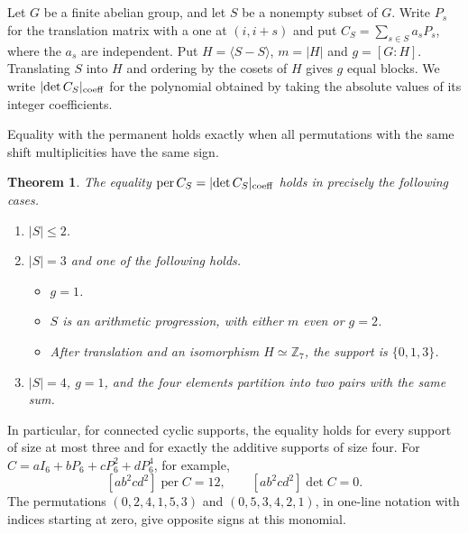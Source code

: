 \documentclass[11pt,reqno]{amsart}
\newtheorem{theorem}{Theorem}[section]
\theoremstyle{remark}
\numberwithin{equation}{section}
\newcommand{\per}{\operatorname{per}}
\begin{document}
\subsection{}

Let \(G\) be a finite abelian group, and let \(S\) be a nonempty
subset of \(G\). Write \(P_s\) for the translation matrix with a
one at \((i,i+s)\) and put \(C_S=\sum_{s\in S}a_sP_s\), where the
\(a_s\) are independent. Put \(H=\langle S-S\rangle\), \(m=|H|\)
and \(g=[G:H]\). Translating \(S\) into \(H\) and ordering by the
cosets of \(H\) gives \(g\) equal blocks. We write
\(\lvert\det C_S\rvert_{\rm coeff}\) for the polynomial obtained by
taking the absolute values of its integer coefficients.

Equality with the permanent holds exactly when all permutations
with the same shift multiplicities have the same sign.

\begin{theorem}\label{thm:sign-classification}
The equality \(\per C_S=\lvert\det C_S\rvert_{\rm coeff}\)
holds in precisely the following cases.
\begin{enumerate}
\item \(|S|\leq2\).
\item \(|S|=3\) and one of the following holds.
\begin{itemize}
\item \(g=1\).
\item \(S\) is an arithmetic progression, with either \(m\) even or \(g=2\).
\item After translation and an isomorphism \(H\simeq\mathbb Z_7\),
      the support is \(\{0,1,3\}\).
\end{itemize}
\item \(|S|=4\), \(g=1\), and the four elements partition into
      two pairs with the same sum.
\end{enumerate}
\end{theorem}

In particular, for connected cyclic supports, the equality holds
for every support of size at most three and for exactly the additive
supports of size four. For \(C=aI_6+bP_6+cP_6^2+dP_6^4\), for
example,
\[
 [ab^2cd^2]\per C=12,\qquad [ab^2cd^2]\det C=0.
\]
The permutations \((0,2,4,1,5,3)\) and \((0,5,3,4,2,1)\), in
one-line notation with indices starting at zero, give opposite
signs at this monomial.

\subsection{}
\end{document}
